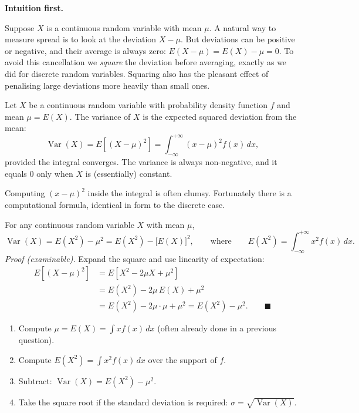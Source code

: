 \documentclass[11pt]{article}
\newcommand{\cle}[1]{{\popxbold\color{popdark}#1}}
\begin{document}
\textbf{Intuition first.}\par
Suppose $X$ is a continuous random variable with mean $\mu$. A natural way to measure spread is to look at the deviation $X - \mu$. But deviations can be positive or negative, and their average is always zero: $E(X-\mu) = E(X) - \mu = 0$. To avoid this cancellation we \emph{square} the deviation before averaging, exactly as we did for discrete random variables. Squaring also has the pleasant effect of penalising large deviations more heavily than small ones.

\begin{definition}
Let $X$ be a continuous random variable with probability density function $f$ and mean $\mu = E(X)$. The \cle{variance} of $X$ is the expected squared deviation from the mean:
\[
\operatorname{Var}(X) = E\!\left[(X-\mu)^2\right] = \int_{-\infty}^{+\infty} (x-\mu)^2 f(x)\,dx,
\]
provided the integral converges. The variance is always non-negative, and it equals $0$ only when $X$ is (essentially) constant.
\end{definition}

Computing $(x-\mu)^2$ inside the integral is often clumsy. Fortunately there is a computational formula, identical in form to the discrete case.

\begin{propriete}
For any continuous random variable $X$ with mean $\mu$,
\[
\operatorname{Var}(X) = E(X^2) - \mu^2 = E(X^2) - \big[E(X)\big]^2,
\qquad\text{where}\qquad
E(X^2) = \int_{-\infty}^{+\infty} x^2 f(x)\,dx.
\]
\emph{Proof (examinable).} Expand the square and use linearity of expectation:
\begin{align*}
E\!\left[(X-\mu)^2\right] &= E\!\left[X^2 - 2\mu X + \mu^2\right] \\
&= E(X^2) - 2\mu\,E(X) + \mu^2 \\
&= E(X^2) - 2\mu\cdot\mu + \mu^2 = E(X^2) - \mu^2. \qquad\blacksquare
\end{align*}
\end{propriete}

\begin{methode}
\begin{enumerate}
\item Compute $\mu = E(X) = \displaystyle\int x f(x)\,dx$ (often already done in a previous question).
\item Compute $E(X^2) = \displaystyle\int x^2 f(x)\,dx$ over the support of $f$.
\item Subtract: $\operatorname{Var}(X) = E(X^2) - \mu^2$.
\item Take the square root if the standard deviation is required: $\sigma = \sqrt{\operatorname{Var}(X)}$.
\end{enumerate}
\end{methode}
\end{document}
